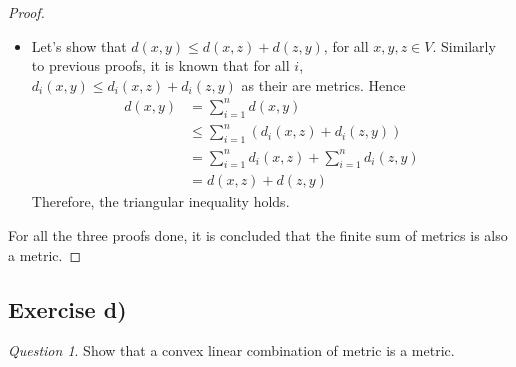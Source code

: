 \documentclass[11pt]{article}
\theoremstyle{definition}
\theoremstyle{remark}
\theoremstyle{remark}
\theoremstyle{remark}
\newtheorem*{question}{Question}
\begin{document}
\begin{proof}
\begin{itemize}
    \item Let's show that $d(x,y) \le d(x, z) + d(z, y)$, for all
      $x, y, z \in V$. Similarly to previous proofs, it is known that for all
      $i$, $d_{i}(x,y) \le d_{i}(x,z) + d_{i}(z, y)$ as their are metrics. Hence
      \begin{align*}
        d(x,y) &= \sum_{i=1}^{n}d(x,y) \\
               &\le \sum_{i=1}^{n}\left(d_{i}(x,z) + d_{i}(z, y)\right) \\
               &= \sum_{i=1}^{n} d_{i}(x,z) + \sum_{i=1}^{n}d_{i}(z,y) \\
               &= d(x, z) + d(z, y)
      \end{align*}
      Therefore, the triangular inequality holds.
  \end{itemize}

  For all the three proofs done, it is concluded that the finite sum of metrics
  is also a metric.
\end{proof}

\subsection*{Exercise d)}
\begin{question}
  Show that a convex linear combination of metric is a metric.
\end{question}
\end{document}
